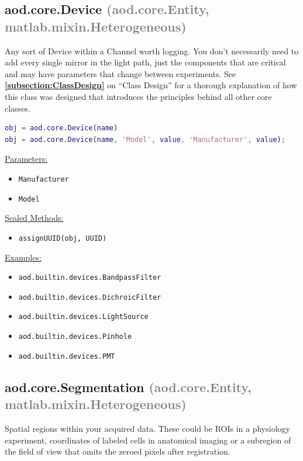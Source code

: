 \documentclass[10pt]{exam}
\newcommand\myurl[1]{\textcolor{blue}{\underline{#1}}}
\newcommand\myref[1]{\textbf{\myurl{\ref{#1}}}}
\newcommand\myparent[1]{\textcolor{gray}{(#1)}}
\newcommand\aodparam[1]{\textcolor{codepurple}{\texttt{#1}}}
\newcommand\aodclass[1]{\textcolor{codeblue}{\texttt{#1}}}
\newcommand\aodfcn[1]{\textcolor{darkteal}{\texttt{#1}}}
\newcommand\docheader[1]{\vspace{0.6ex}\noindent\underline{#1}\vspace{0.15ex}}
\begin{document}
	\subsection{aod.core.Device  \myparent{aod.core.Entity, matlab.mixin.Heterogeneous}}
		\noindent Any sort of Device within a Channel worth logging. You don't necessarily need to add every single mirror in the light path, just the components that are critical and may have parameters that change between experiments. See \myref{subsection:ClassDesign} on ``Class Design'' for a thorough explanation of how this class was designed that introduces the principles behind all other core classes.
		
		\begin{lstlisting}[language=matlab]
obj = aod.core.Device(name)
obj = aod.core.Device(name, 'Model', value, 'Manufacturer', value);
		\end{lstlisting}
		\docheader{Parameters:}
		\begin{itemize}
			\item \aodparam{Manufacturer}
			\item \aodparam{Model}
		\end{itemize}
		\docheader{Sealed Methods:}
		\begin{itemize}
			\item \aodfcn{assignUUID(obj, UUID)}
		\end{itemize}
		\docheader{Examples:}
		\begin{itemize}
			\item \aodclass{aod.builtin.devices.BandpassFilter}
			\item \aodclass{aod.builtin.devices.DichroicFilter}
			\item \aodclass{aod.builtin.devices.LightSource}
			\item \aodclass{aod.builtin.devices.Pinhole}
			\item \aodclass{aod.builtin.devices.PMT}
		\end{itemize}
	
	\subsection{aod.core.Segmentation \myparent{aod.core.Entity, matlab.mixin.Heterogeneous}} 
		\noindent Spatial regions within your acquired data. These could be ROIs in a physiology experiment, coordinates of labeled cells in anatomical imaging or a subregion of the field of view that omits the zeroed pixels after registration.  
	
\end{document}
